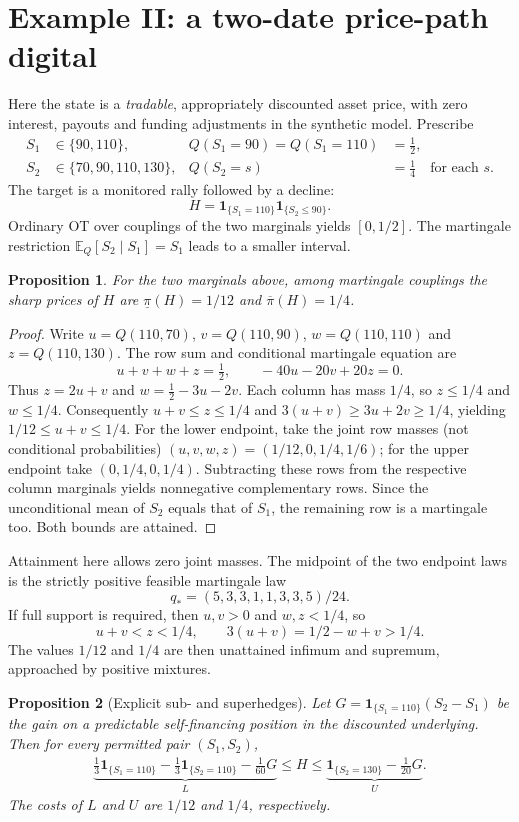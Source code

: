 \documentclass[11pt]{article}
\newtheorem{proposition}{Proposition}
\newcommand{\one}{\mathbf{1}}
\newcommand{\EE}{\mathbb{E}}
\begin{document}
\section{Example II: a two-date price-path digital}
Here the state is a \emph{tradable}, appropriately discounted asset price,
with zero interest, payouts and funding adjustments in the synthetic model.
Prescribe
\begin{align}
S_1&\in\{90,110\}, &Q(S_1=90)=Q(S_1=110)&=\tfrac12,\\
S_2&\in\{70,90,110,130\}, &Q(S_2=s)&=\tfrac14\quad\text{for each }s.
\end{align}
The target is a monitored rally followed by a decline:
\begin{equation}
H=\one_{\{S_1=110\}}\one_{\{S_2\le90\}}.
\end{equation}
Ordinary OT over couplings of the two marginals yields $[0,1/2]$. The
martingale restriction $\EE_Q[S_2\mid S_1]=S_1$ leads to a smaller interval.
\begin{proposition}
For the two marginals above, among martingale couplings the sharp prices of
$H$ are $\underline\pi(H)=1/12$ and $\overline\pi(H)=1/4$.
\end{proposition}
\begin{proof}
Write $u=Q(110,70)$, $v=Q(110,90)$, $w=Q(110,110)$ and
$z=Q(110,130)$. The row sum and conditional martingale equation are
\begin{equation}
u+v+w+z=\tfrac12,\qquad -40u-20v+20z=0.
\end{equation}
Thus $z=2u+v$ and $w=\tfrac12-3u-2v$. Each column has mass $1/4$,
so $z\le1/4$ and $w\le1/4$. Consequently
$u+v\le z\le1/4$ and
$3(u+v)\ge3u+2v\ge1/4$, yielding
$1/12\le u+v\le1/4$.
For the lower endpoint, take the joint row masses (not conditional probabilities)
$(u,v,w,z)=(1/12,0,1/4,1/6)$; for the upper endpoint take
$(0,1/4,0,1/4)$. Subtracting these rows from the respective column
marginals yields nonnegative complementary rows. Since the unconditional
mean of $S_2$ equals that of $S_1$, the remaining row is a martingale too.
Both bounds are attained.
\end{proof}
Attainment here allows zero joint masses. The midpoint of the two endpoint
laws is the strictly positive feasible martingale law
\[
q_*=(5,3,3,1,1,3,3,5)/24.
\]
If full support is required, then $u,v>0$ and $w,z<1/4$, so
\[
u+v<z<1/4,\qquad 3(u+v)=1/2-w+v>1/4.
\]
The values $1/12$ and $1/4$
are then unattained infimum and supremum, approached by positive mixtures.
\begin{proposition}[Explicit sub- and superhedges]
Let $G=\one_{\{S_1=110\}}(S_2-S_1)$ be the gain on a predictable
self-financing position in the discounted underlying. Then for every
permitted pair $(S_1,S_2)$,
\begin{align}
\underbrace{\tfrac13\one_{\{S_1=110\}}-
\tfrac13\one_{\{S_2=110\}}-\tfrac1{60}G}_{L}
\le H\le
\underbrace{\one_{\{S_2=130\}}-\tfrac1{20}G}_{U}.
\end{align}
The costs of $L$ and $U$ are $1/12$ and $1/4$, respectively.
\end{proposition}
\end{document}
